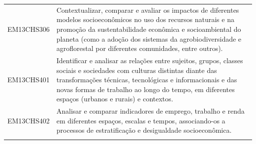 \documentclass[12pt]{extarticle}
\begin{document}
\begin{longtable}{ll}
EM13CHS306 & Contextualizar, comparar e avaliar os impactos de diferentes modelos socioeconômicos no uso dos recursos naturais e na promoção da sustentabilidade econômica e socioambiental do planeta (como a adoção dos sistemas da agrobiodiversidade e agroflorestal por diferentes comunidades, entre outros).                                                                                                                                                                                                                                                                                                                                                                                                                                                                                                                \\
\rowcolor[HTML]{E0F7FA} 
EM13CHS401 & Identificar e analisar as relações entre sujeitos, grupos, classes sociais e sociedades com culturas distintas diante das transformações técnicas, tecnológicas e informacionais e das novas formas de trabalho ao longo do tempo, em diferentes espaços (urbanos e rurais) e contextos.                                                                                                                                                                                                                                                                                                                                                                                                                                                                                                                              \\
\rowcolor[HTML]{FFF} 
EM13CHS402 & Analisar e comparar indicadores de emprego, trabalho e renda em diferentes espaços, escalas e tempos, associando-os a processos de estratificação e desigualdade socioeconômica.                                                                                                                                                                                                                                                                                                                                                                                                                                                                                                                                                                                                                                      \\
\rowcolor[HTML]{E0F7FA} 

\end{longtable}
\end{document}
